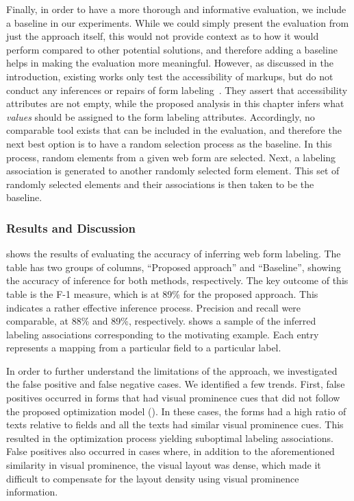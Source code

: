 Finally, in order to have a more thorough and informative evaluation, we include a baseline in our experiments. 
While we could simply present the evaluation from just the approach 
itself, this would not provide context as to how it would 
perform compared to other potential solutions, and therefore 
adding a baseline helps in making the evaluation more meaningful. 
However, as discussed in the introduction, 
existing works only test the accessibility of markups, but do not 
conduct any inferences or repairs of form labeling~\cite{yesilada2019web, ukgov:audit:2018}. 
They assert that accessibility attributes are not empty, 
while the proposed analysis in this chapter infers what \emph{values}  
should be assigned to the form labeling attributes. 
Accordingly, no comparable tool exists that can be included in the evaluation, and 
therefore the next best option is to have a random selection process as the baseline. 
In this process, random elements from a given web form are selected. 
Next, a labeling association is generated to another randomly selected form element. 
This set of randomly selected elements and their associations 
is then taken to be the baseline.



\subsubsection{Results and Discussion}
 shows the results of evaluating the accuracy 
of inferring web form labeling. 
The table has two groups of columns, ``Proposed approach'' 
and ``Baseline'', 
showing the accuracy of inference for both methods, respectively. 
The key outcome of this table is the F-1 measure, 
which is at 89\% for the proposed approach. 
This indicates a rather effective inference process. 
Precision and recall were comparable, at 88\% and 89\%, 
respectively. 
 shows a sample of the inferred labeling 
associations corresponding to the motivating example. Each 
entry represents a mapping from a particular field to a particular label.



In order to further understand the limitations of the approach, 
we investigated the false positive and false negative cases. 
We identified a few trends. First, false positives occurred in 
forms that had visual prominence cues that did not follow the 
proposed optimization model (). In these 
cases, the forms had a high ratio of texts relative to fields 
and all the texts had similar visual prominence cues. This 
resulted in the optimization process yielding suboptimal 
labeling associations. False positives also occurred in cases 
where, in addition to the aforementioned similarity in visual 
prominence, the visual layout was dense, which made it difficult 
to compensate for the layout density using visual prominence information. 

